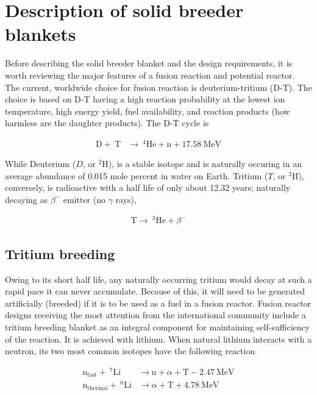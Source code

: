 \section{Description of solid breeder blankets}\label{sec:intro-blanket-description}

Before describing the solid breeder blanket and the design requirements, it is worth reviewing the major features of a fusion reaction and potential reactor. The current, worldwide choice for fusion reaction is deuterium-tritium (D-T). The choice is based on D-T having a high reaction probability at the lowest ion temperature, high energy yield, fuel availability, and reaction products (how harmless are the daughter products). The D-T cycle is

\begin{align}
	\mathrm{D} +~\mathrm{T}&\xrightarrow{}~^4\mathrm{He}+\mathrm{n}+17.58~\text{MeV} \label{eq:dt-reaction}
\end{align}

While Deuterium ($D$, or $^2$H), is a stable isotope and is naturally occuring in an average abundance of 0.015 mole percent in water on Earth. Tritium ($T$, or $^3$H), conversely, is radioactive with a half life of only about 12.32 years; naturally decaying as $\beta^-$ emitter (no $\gamma$ rays),

\begin{align}\label{eq:t-decay}
	\mathrm{T} \xrightarrow{}~^3\mathrm{He} + \beta^-
\end{align}



\subsection{Tritium breeding}

Owing to its short half life, any naturally occurring tritium would decay at such a rapid pace it can never accumulate. Because of this, it will need to be generated artificially (breeded) if it is to be used as a fuel in a fusion reactor. Fusion reactor designs receiving the most attention from the international community include a tritium breeding blanket as an integral component for maintaining self-sufficiency of the reaction. It is achieved with lithium. When natural lithium interacts with a neutron, its two most common isotopes have the following reaction

\begin{align}
	\mathrm{n}_\text{fast} + ~^7\mathrm{Li} &\xrightarrow ~\mathrm{n}+\alpha + \mathrm{T} -2.47~\text{MeV}\label{eq:Li7T}\\
	\mathrm{n}_\text{thermal} + ~^6\mathrm{Li} &\xrightarrow ~ \alpha + \mathrm{T} +4.78~\text{MeV} \label{eq:Li6T}
\end{align}

